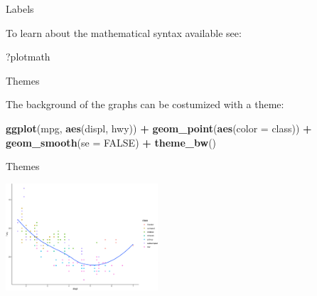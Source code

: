\documentclass[ignorenonframetext,]{beamer}
\newenvironment{Shaded}{\begin{snugshade}}{\end{snugshade}}
\newcommand{\DataTypeTok}[1]{\textcolor[rgb]{0.13,0.29,0.53}{#1}}
\newcommand{\KeywordTok}[1]{\textcolor[rgb]{0.13,0.29,0.53}{\textbf{#1}}}
\newcommand{\NormalTok}[1]{#1}
\newcommand{\OperatorTok}[1]{\textcolor[rgb]{0.81,0.36,0.00}{\textbf{#1}}}
\newcommand{\OtherTok}[1]{\textcolor[rgb]{0.56,0.35,0.01}{#1}}
\newcommand{\StringTok}[1]{\textcolor[rgb]{0.31,0.60,0.02}{#1}}
\begin{document}
\begin{frame}[fragile]{Labels}
\protect\hypertarget{labels-9}{}

To learn about the mathematical syntax available see:

\begin{Shaded}
\begin{Highlighting}[]
\NormalTok{?plotmath}
\end{Highlighting}
\end{Shaded}

\end{frame}

\begin{frame}[fragile]{Themes}
\protect\hypertarget{themes}{}

The background of the graphs can be costumized with a theme:

\begin{Shaded}
\begin{Highlighting}[]
\KeywordTok{ggplot}\NormalTok{(mpg, }\KeywordTok{aes}\NormalTok{(displ, hwy)) }\OperatorTok{+}
\StringTok{  }\KeywordTok{geom_point}\NormalTok{(}\KeywordTok{aes}\NormalTok{(}\DataTypeTok{color =}\NormalTok{ class)) }\OperatorTok{+}
\StringTok{  }\KeywordTok{geom_smooth}\NormalTok{(}\DataTypeTok{se =} \OtherTok{FALSE}\NormalTok{) }\OperatorTok{+}
\StringTok{  }\KeywordTok{theme_bw}\NormalTok{()}
\end{Highlighting}
\end{Shaded}

\end{frame}

\begin{frame}{Themes}
\protect\hypertarget{themes-1}{}

\begin{center}\includegraphics[height=150px]{data-visualization_files/figure-beamer/unnamed-chunk-157-1} \end{center}

\end{frame}
\end{document}
